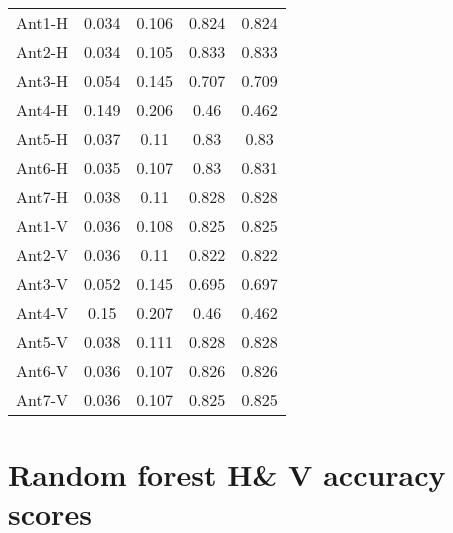 \begin{table}[H]
\begin{center}
{\begin{tabular}{| c | c | c | c | c |}
Ant1-H&0.034 & 0.106 & 0.824    & 0.824     \\
Ant2-H&0.034 & 0.105 & 0.833    & 0.833     \\
Ant3-H&0.054 & 0.145 & 0.707    & 0.709     \\
Ant4-H&0.149 & 0.206 & 0.46     & 0.462     \\
Ant5-H&0.037 & 0.11  & 0.83     & 0.83      \\
Ant6-H&0.035 & 0.107 & 0.83     & 0.831     \\
Ant7-H&0.038 & 0.11  & 0.828    & 0.828     \\
Ant1-V&0.036 & 0.108 & 0.825    & 0.825     \\
Ant2-V&0.036 & 0.11  & 0.822    & 0.822     \\
Ant3-V&0.052 & 0.145 & 0.695    & 0.697     \\
Ant4-V&0.15  & 0.207 & 0.46     & 0.462     \\
Ant5-V&0.038 & 0.111 & 0.828    & 0.828     \\
Ant6-V&0.036 & 0.107 & 0.826    & 0.826     \\
Ant7-V&0.036 & 0.107 & 0.825    & 0.825     \\
\hline
\end{tabular}}
\end{center}
\end{table}

\section{Random forest H\& V accuracy scores}

